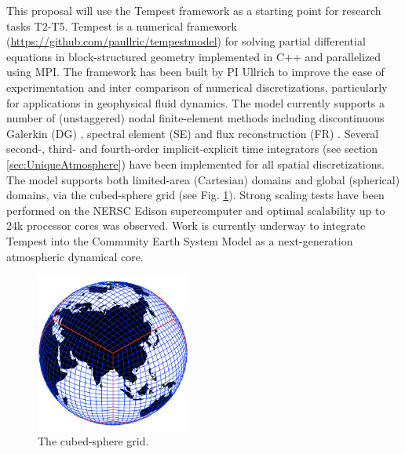 \documentclass[11pt]{article}
\begin{document}

This proposal will use the Tempest framework \cite{ullrich2014global} as a starting point for research tasks T2-T5.  Tempest is a numerical framework (\url{https://github.com/paullric/tempestmodel}) \cite{ullrich2014global} for solving partial differential equations in block-structured geometry implemented in C++ and parallelized using MPI.  The framework has been built by PI Ullrich to improve the ease of experimentation and inter comparison of numerical discretizations, particularly for applications in geophysical fluid dynamics.  The model currently supports a number of (unstaggered) nodal finite-element methods including discontinuous Galerkin (DG) \cite{cockburn2000development}, spectral element (SE) \cite{maday1989spectral} and flux reconstruction (FR) \cite{huynh2007flux}.  Several second-, third- and fourth-order implicit-explicit time integrators (see section \ref{sec:UniqueAtmosphere}) have been implemented for all spatial discretizations.  The model supports both limited-area (Cartesian) domains and global (spherical) domains, via the cubed-sphere grid (see Fig. \ref{fig:CubedSphere}).  Strong scaling tests have been performed on the NERSC Edison supercomputer and optimal scalability up to 24k processor cores was observed.  Work is currently underway to integrate Tempest into the Community Earth System Model \cite{JWHetal2013BAMS} as a next-generation atmospheric dynamical core.

\begin{figure}
\begin{center}
\includegraphics[width=2in]{A_CubedSphere}
\end{center}
\caption{The cubed-sphere grid.} \label{fig:CubedSphere}
\end{figure}
\end{document}
